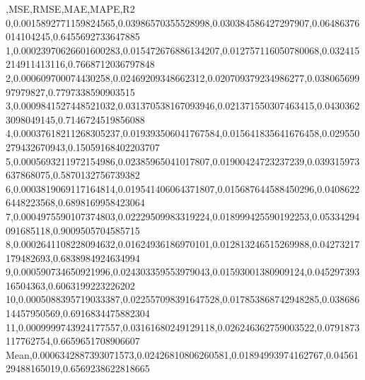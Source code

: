 ,MSE,RMSE,MAE,MAPE,R2
0,0.0015892771159824565,0.03986570355528998,0.030384586427297907,0.06486376014104245,0.6455692733647885
1,0.00023970626601600283,0.015472676886134207,0.012757116050780068,0.032415214911413116,0.7668712036797848
2,0.000609700074430258,0.02469209348662312,0.020709379234986277,0.03806569997979827,0.7797338590903515
3,0.0009841527448521032,0.031370538167093946,0.021371550307463415,0.04303623098049145,0.7146724519856088
4,0.00037618211268305237,0.019393506041767584,0.015641835641676458,0.029550279432670943,0.15059168402203707
5,0.0005693211972154986,0.02385965041017807,0.01900424723237239,0.039315973637868075,0.5870132756739382
6,0.0003819069117164814,0.019541406064371807,0.015687644588450296,0.04086226448223568,0.6898169958423064
7,0.0004975590107374803,0.02229509983319224,0.018999425590192253,0.05334294091685118,0.9009505704585715
8,0.0002641108228094632,0.01624936186970101,0.012813246515269988,0.04273217179482693,0.6838984924634994
9,0.000590734650921996,0.024303359553979043,0.01593001380909124,0.04529739316504363,0.6063199223226202
10,0.0005088395719033387,0.022557098391647528,0.017853868742948285,0.03868614457950569,0.6916834475882304
11,0.0009999743924177557,0.03161680249129118,0.026246362759003522,0.0791873117762754,0.6659651708906607
Mean,0.0006342887393071573,0.02426810806260581,0.01894993974162767,0.0456129488165019,0.6569238622818665
